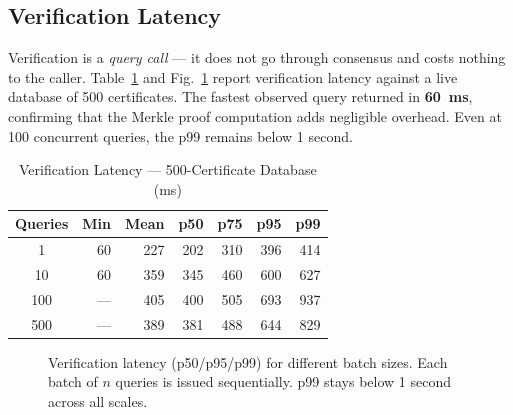 \documentclass[journal]{IEEEtran}
\begin{document}
\subsection{Verification Latency}

Verification is a \emph{query call} — it does not go through consensus and costs nothing to the caller. Table~\ref{tab:verif} and Fig.~\ref{fig:verif_perc} report verification latency against a live database of 500 certificates. The fastest observed query returned in \textbf{60~ms}, confirming that the Merkle proof computation adds negligible overhead. Even at 100 concurrent queries, the p99 remains below 1 second.

\begin{table}[t]
\caption{Verification Latency --- 500-Certificate Database (ms)}
\label{tab:verif}
\centering\small\renewcommand{\arraystretch}{1.1}
\begin{tabular}{@{}crrrrrr@{}}
\toprule
\textbf{Queries} & \textbf{Min} & \textbf{Mean} & \textbf{p50} & \textbf{p75} & \textbf{p95} & \textbf{p99} \\
\midrule
1   & 60  & 227 & 202 & 310 & 396 & 414 \\
10  & 60  & 359 & 345 & 460 & 600 & 627 \\
100 & --- & 405 & 400 & 505 & 693 & 937 \\
500 & --- & 389 & 381 & 488 & 644 & 829 \\
\bottomrule
\end{tabular}
\end{table}

\begin{figure}[t]
\centering
{}
\caption{Verification latency (p50/p95/p99) for different batch sizes. Each batch of $n$ queries is issued sequentially. p99 stays below 1 second across all scales.}
\label{fig:verif_perc}
\end{figure}
\end{document}
